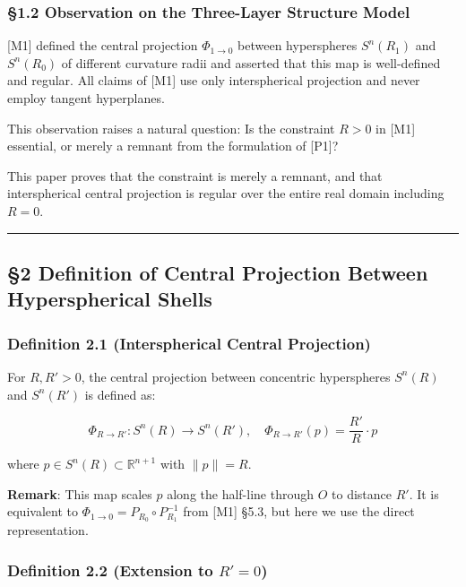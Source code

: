 \documentclass[
  a4paper]{article}
\begin{document}
\subsubsection{§1.2 Observation on the Three-Layer Structure
Model}\label{observation-on-the-three-layer-structure-model}

{[}M1{]} defined the central projection \(\Phi_{1 \to 0}\) between
hyperspheres \(S^n(R_1)\) and \(S^n(R_0)\) of different curvature radii
and asserted that this map is well-defined and regular. All claims of
{[}M1{]} use only interspherical projection and never employ tangent
hyperplanes.

This observation raises a natural question: Is the constraint \(R > 0\)
in {[}M1{]} essential, or merely a remnant from the formulation of
{[}P1{]}?

This paper proves that the constraint is merely a remnant, and that
interspherical central projection is regular over the entire real domain
including \(R = 0\).

\begin{center}\rule{0.5\linewidth}{0.5pt}\end{center}

\subsection{§2 Definition of Central Projection Between Hyperspherical
Shells}\label{definition-of-central-projection-between-hyperspherical-shells}

\subsubsection{Definition 2.1 (Interspherical Central
Projection)}\label{definition-2.1-interspherical-central-projection}

For \(R, R' > 0\), the central projection between concentric
hyperspheres \(S^n(R)\) and \(S^n(R')\) is defined as:

\[
\Phi_{R \to R'} : S^n(R) \to S^n(R'), \quad \Phi_{R \to R'}(p) = \frac{R'}{R} \cdot p
\]

where \(p \in S^n(R) \subset \mathbb{R}^{n+1}\) with \(\|p\| = R\).

\textbf{Remark}: This map scales \(p\) along the half-line through \(O\)
to distance \(R'\). It is equivalent to
\(\Phi_{1 \to 0} = P_{R_0} \circ P_{R_1}^{-1}\) from {[}M1{]} §5.3, but
here we use the direct representation.

\subsubsection{\texorpdfstring{Definition 2.2 (Extension to
\(R' = 0\))}{Definition 2.2 (Extension to R\textquotesingle{} = 0)}}\label{definition-2.2-extension-to-r-0}
\end{document}
